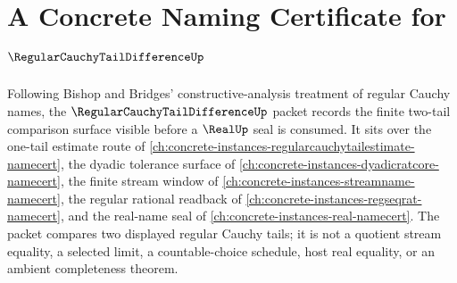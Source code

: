 \chapter{A Concrete Naming Certificate for $\RegularCauchyTailDifferenceUp$}
\label{ch:concrete-instances-regular-cauchy-tail-difference-namecert}

Following Bishop and Bridges' constructive-analysis treatment of regular
Cauchy names, the $\RegularCauchyTailDifferenceUp$ packet records the finite
two-tail comparison surface visible before a $\RealUp$ seal is consumed. It
sits over the one-tail estimate route of
\autoref{ch:concrete-instances-regularcauchytailestimate-namecert}, the
dyadic tolerance surface of
\autoref{ch:concrete-instances-dyadicratcore-namecert}, the finite stream
window of \autoref{ch:concrete-instances-streamname-namecert}, the regular
rational readback of \autoref{ch:concrete-instances-regseqrat-namecert}, and
the real-name seal of \autoref{ch:concrete-instances-real-namecert}. The
packet compares two displayed regular Cauchy tails; it is not a quotient
stream equality, a selected limit, a countable-choice schedule, host real
equality, or an ambient completeness theorem.

